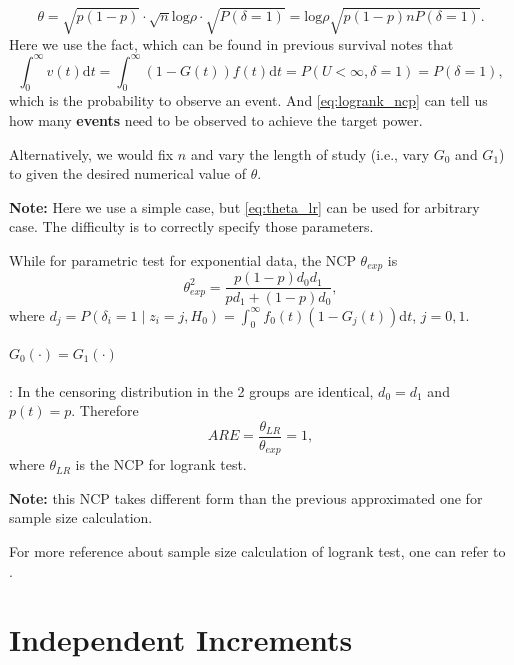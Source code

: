 \documentclass[a4paper,12pt]{article}
\begin{document}
\begin{equation}
  \label{eq:logrank_ncp}
  \theta =
  \sqrt{p\left(1 - p\right)}
  \cdot
  \sqrt{n}\mathrm{log}\rho
  \cdot
  \sqrt{P\left(\delta = 1\right)}
  =
  \mathrm{log}\rho
  \sqrt{
    p\left(1 - p\right)
    n
    P\left(\delta = 1\right)
  }
  .  
\end{equation}
Here we use the fact, which can be found in {\color{red} previous survival notes} that
\[
  \int_0^\infty v\left(t\right)\mathrm{d}t =
  \int_0^\infty \left(1 - G\left(t\right)\right)f\left(t\right)
  \mathrm{d}t
  = P\left(U < \infty, \delta = 1\right)
  = P\left(\delta = 1\right)
  ,
\]
which is the probability to observe an event. And \eqref{eq:logrank_ncp} can tell us how many \textbf{events} need to be observed to achieve the target power.
\par
Alternatively, we would fix $n$ and vary the length of study (i.e., vary $G_0$ and $G_1$) to given the desired numerical value of $\theta$.
\par
\textbf{Note:} Here we use a simple case, but \eqref{eq:theta_lr} can be used for arbitrary case. The difficulty is to correctly specify those parameters.
\par
While for parametric test for exponential data, the NCP $\theta_{exp}$ is
\[
  \theta^2_{exp}
  = \frac{
    p\left(1 - p\right)d_0d_1
  }{
    pd_1 + \left(1 - p\right)d_0
  }
  ,
\]
where $d_j = P\left(\delta_i = 1\middle|z_i = j, H_0\right) = \int_0^{\infty}f_0\left(t\right)\left(1 - G_j\left(t\right)\right)\mathrm{d}t$, $j = 0, 1$. 
\par

\paragraph{$G_0\left(\cdot\right) = G_1\left(\cdot\right)$}: In the censoring distribution in the 2 groups are identical, $d_0 = d_1$ and $p\left(t\right) = p$. Therefore
\[
  ARE = \frac{\theta_{LR}}{\theta_{exp}} = 1
  ,
\]
where $\theta_{LR}$ is the NCP for logrank test.
\par
\textbf{Note:} this NCP takes different form than the previous approximated one for sample size calculation.
\par
For more reference about sample size calculation of logrank test, one can refer to \citet{Lu2020p229-244, Jung2012p485-495, Lakatos1992p179-191, Tekindal2018p-, Wu2014p26-33}.


\section{Independent Increments}
\label{sec:indep-incr}
\end{document}
